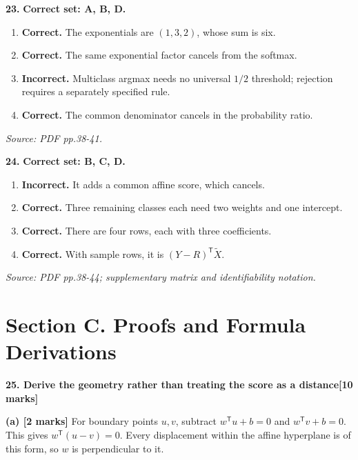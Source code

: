 \documentclass[11pt,a4paper]{article}
\begin{document}
\par\noindent\begin{minipage}{\linewidth}
\textbf{23.} \textbf{Correct set: A, B, D.}
\begin{enumerate}[label=(\Alph*),leftmargin=8mm,itemsep=2pt,topsep=2pt]
\item \textbf{Correct.} The exponentials are \((1,3,2)\), whose sum is six.
\item \textbf{Correct.} The same exponential factor cancels from the softmax.
\item \textbf{Incorrect.} Multiclass argmax needs no universal \(1/2\) threshold; rejection requires a separately specified rule.
\item \textbf{Correct.} The common denominator cancels in the probability ratio.
\end{enumerate}
{\footnotesize\textit{Source: PDF pp.38-41.}}

\end{minipage}\par\vspace{3mm}
\par\noindent\begin{minipage}{\linewidth}
\textbf{24.} \textbf{Correct set: B, C, D.}
\begin{enumerate}[label=(\Alph*),leftmargin=8mm,itemsep=2pt,topsep=2pt]
\item \textbf{Incorrect.} It adds a common affine score, which cancels.
\item \textbf{Correct.} Three remaining classes each need two weights and one intercept.
\item \textbf{Correct.} There are four rows, each with three coefficients.
\item \textbf{Correct.} With sample rows, it is \((Y-R)^{\mathsf T}\widetilde X\).
\end{enumerate}
{\footnotesize\textit{Source: PDF pp.38-44; supplementary matrix and identifiability notation.}}

\end{minipage}\par\vspace{3mm}
\newpage\section*{Section C. Proofs and Formula Derivations}
\textbf{25. Derive the geometry rather than treating the score as a distance}\hfill\textbf{[10 marks]}\par\medskip
\textbf{(a) [2 marks]} For boundary points \(u,v\), subtract \(w^{\mathsf T}u+b=0\) and \(w^{\mathsf T}v+b=0\). This gives \(w^{\mathsf T}(u-v)=0\). Every displacement within the affine hyperplane is of this form, so \(w\) is perpendicular to it.
\end{document}
